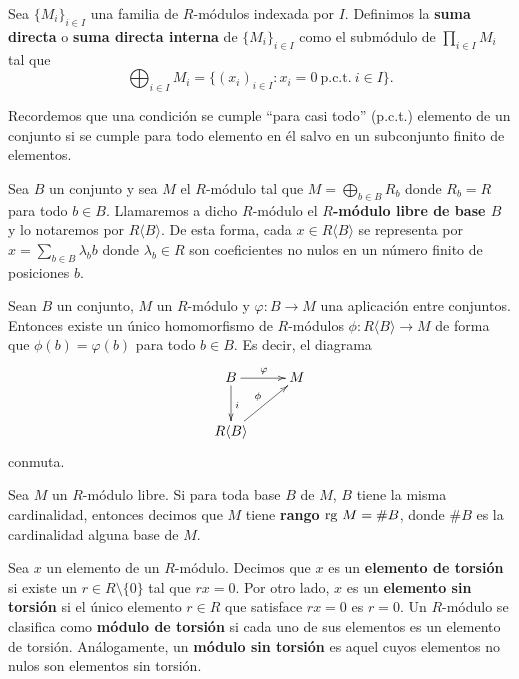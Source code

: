 \begin{definicion}
	Sea $\{M_{i}\}_{i \in I}$ una familia de $R$-módulos indexada por $I$.
	Definimos la \textbf{suma directa} o \textbf{suma directa interna} de
	$\{M_{i}\}_{i \in I}$ como el submódulo de $\prod_{i \in I}M_{i}$ tal que
	\[
	\bigoplus_{i \in I}M_{i}= \{(x_{i})_{i \in I}: x_{i}= 0 \ \text{p.c.t.}\ i \in
	I\}.
	\]
\end{definicion}
\begin{nota}
	Recordemos que una condición se cumple \enquote{para casi todo} (p.c.t.) elemento
	de un conjunto si se cumple para todo elemento en él salvo en un subconjunto finito
	de elementos.
\end{nota}
\begin{definicion}
	Sea $B$ un conjunto y sea $M$ el $R$-módulo tal que $M = \bigoplus_{b \in B}R_{b}$
	donde $R_{b}=R$ para todo $b \in B$. Llamaremos a dicho $R$-módulo el \textbf{$R$-módulo
		libre de base $B$} y lo notaremos por $R \langle B \rangle$. De esta forma, cada
	$x \in R \langle B \rangle$ se representa por $x = \sum_{b\in B}\lambda_{b}b$ donde
	$\lambda_{b}\in R$ son coeficientes no nulos en un número finito de posiciones
	$b$.
\end{definicion}

\begin{teorema}
	 \label{teo:univ-prop-free-mod} Sean
	$B$ un conjunto, $M$ un $R$-módulo y $\varphi : B \to M$ una aplicación entre
	conjuntos. Entonces existe un único homomorfismo de $R$-módulos $\phi : R \langle
	B \rangle \to M$ de forma que $\phi(b) = \varphi(b)$ para todo $b \in B$. Es
	decir, el diagrama
	\[
	\xymatrix{ B \ar@{->}[r]^{\varphi} \ar@{->}[d]^{i} & M \\ R \langle B \rangle \ar@{->}[ru]^{\phi} & }
	\]
	conmuta.
\end{teorema}

\begin{definicion}
	Sea $M$ un $R$-módulo libre. Si para toda base $B$ de $M$, $B$ tiene la misma cardinalidad,
	entonces decimos que $M$ tiene \textbf{rango} $\operatorname{rg} \, M = \# B$, donde $\# B$
	es la cardinalidad alguna base de $M$.
\end{definicion}
\begin{definicion}
	Sea $x$ un elemento de un $R$-módulo. Decimos que $x$ es un\textbf{ elemento de
		torsión} si existe un $r \in R \setminus \{0\}$ tal que $rx = 0$. Por otro lado,
	$x$ es un \textbf{elemento sin torsión} si el único elemento $r \in R$ que satisface
	$rx = 0$ es $r = 0$. Un $R$-módulo se clasifica como \textbf{módulo de torsión}
	si cada uno de sus elementos es un elemento de torsión. Análogamente, un \textbf{módulo
		sin torsión} es aquel cuyos elementos no nulos son elementos sin torsión.
\end{definicion}

